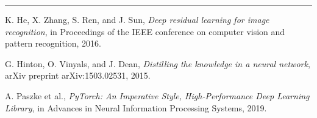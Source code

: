 \documentclass[12pt,a4paper]{article}
\begin{document}
\newpage
\hrule
\vspace{0.5cm}
\begin{thebibliography}{9}
    K. He, X. Zhang, S. Ren, and J. Sun,
    \textit{Deep residual learning for image recognition},
    in Proceedings of the IEEE conference on computer vision and pattern recognition, 2016.
    
    G. Hinton, O. Vinyals, and J. Dean,
    \textit{Distilling the knowledge in a neural network},
    arXiv preprint arXiv:1503.02531, 2015.

    A. Paszke et al.,
    \textit{PyTorch: An Imperative Style, High-Performance Deep Learning Library},
    in Advances in Neural Information Processing Systems, 2019.

\end{thebibliography}
\end{document}
